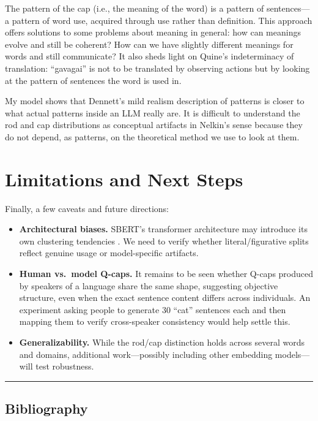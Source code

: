 \documentclass[12pt]{article}
\begin{document}
The pattern of the cap (i.e., the meaning of the word) is a pattern of sentences---a pattern of word use, acquired through use rather than definition. This approach offers solutions to some problems about meaning in general: how can meanings evolve and still be coherent? How can we have slightly different meanings for words and still communicate? It also sheds light on Quine's indeterminacy of translation: ``gavagai'' is not to be translated by observing actions but by looking at the pattern of sentences the word is used in.

My model shows that Dennett's mild realism description of patterns is closer to what actual patterns inside an LLM really are. It is difficult to understand the rod and cap distributions as conceptual artifacts in Nelkin's sense because they do not depend, as patterns, on the theoretical method we use to look at them.

\section{Limitations and Next Steps}\label{limitations-and-next-steps}

Finally, a few caveats and future directions:
\begin{itemize}
  \item \textbf{Architectural biases.} SBERT's transformer architecture may introduce its own clustering tendencies \cite{ref-lavieInfiniteSymmetry2024,ref-vasileiouBiLRP2024,ref-wenPrototype2025}. We need to verify whether literal/figurative splits reflect genuine usage or model-specific artifacts.
  \item \textbf{Human vs.~model Q-caps.} It remains to be seen whether Q-caps produced by speakers of a language share the same shape, suggesting objective structure, even when the exact sentence content differs across individuals. An experiment asking people to generate 30 ``cat'' sentences each and then mapping them to verify cross-speaker consistency would help settle this.
  \item \textbf{Generalizability.} While the rod/cap distinction holds across several words and domains, additional work---possibly including other embedding models---will test robustness.
\end{itemize}

\begin{center}\rule{0.5\linewidth}{0.5pt}\end{center}

\subsection*{Bibliography}\label{bibliography}
\end{document}
